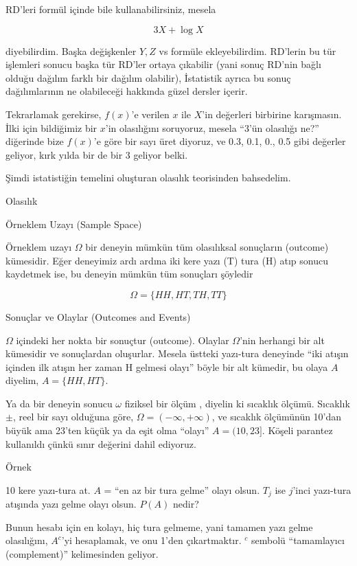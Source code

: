 \documentclass[12pt,fleqn]{article}\usepackage{../../common}
\begin{document}
RD'leri formül içinde bile kullanabilirsiniz, mesela 

$$ 3X + \log X $$ 

diyebilirdim. Başka değişkenler $Y,Z$ vs formüle ekleyebilirdim. RD'lerin
bu tür işlemleri sonucu başka tür RD'ler ortaya çıkabilir (yani sonuç
RD'nin bağlı olduğu dağılım farklı bir dağılım olabilir), İstatistik ayrıca
bu sonuç dağılımlarının ne olabileceği hakkında güzel dersler içerir.

Tekrarlamak gerekirse, $f(x)$'e verilen $x$ ile $X$'in değerleri birbirine
karışmasın. İlki için bildiğimiz bir $x$'in olasılığını soruyoruz, mesela
``3'ün olasılığı ne?'' diğerinde bize $f(x)$'e göre bir sayı üret diyoruz,
ve 0.3, 0.1, 0., 0.5 gibi değerler geliyor, kırk yılda bir de bir 3 geliyor
belki.

Şimdi istatistiğin temelini oluşturan olasılık teorisinden bahsedelim.

Olasılık

Örneklem Uzayı (Sample Space)

Örneklem uzayı $\Omega$ bir deneyin mümkün tüm olasılıksal sonuçların
(outcome) kümesidir. Eğer deneyimiz ardı ardına iki kere yazı (T) tura (H)
atıp sonucu kaydetmek ise, bu deneyin mümkün tüm sonuçları şöyledir

$$\Omega = \{HH,HT,TH,TT\} $$

Sonuçlar ve Olaylar (Outcomes and Events)

$\Omega$ içindeki her nokta bir sonuçtur (outcome). Olaylar $\Omega$'nin
herhangi bir alt kümesidir ve sonuçlardan oluşurlar. Mesela üstteki
yazı-tura deneyinde ``iki atışın içinden ilk atışın her zaman H gelmesi
olayı'' böyle bir alt kümedir, bu olaya $A$ diyelim, $A =
\{HH,HT\}$.

Ya da bir deneyin sonucu $\omega$ fiziksel bir ölçüm , diyelin ki sıcaklık
ölçümü. Sıcaklık $\pm$, reel bir sayı olduğuna göre, $\Omega = (-\infty,
+\infty)$, ve sıcaklık ölçümünün 10'dan büyük ama 23'ten küçük ya da eşit
olma ``olayı'' $A = (10,23]$. Köşeli parantez kullanıldı çünkü sınır
değerini dahil ediyoruz. 

Örnek 

10 kere yazı-tura at. $A$ = ``en az bir tura gelme'' olayı olsun. $T_j$ ise
$j$'inci yazı-tura atışında yazı gelme olayı olsun. $P(A)$ nedir? 

Bunun hesabı için en kolayı, hiç tura gelmeme, yani tamamen yazı gelme
olasılığını, $A^c$'yi hesaplamak, ve onu 1'den çıkartmaktır. $^c$ sembolü
``tamamlayıcı (complement)'' kelimesinden geliyor.
\end{document}
